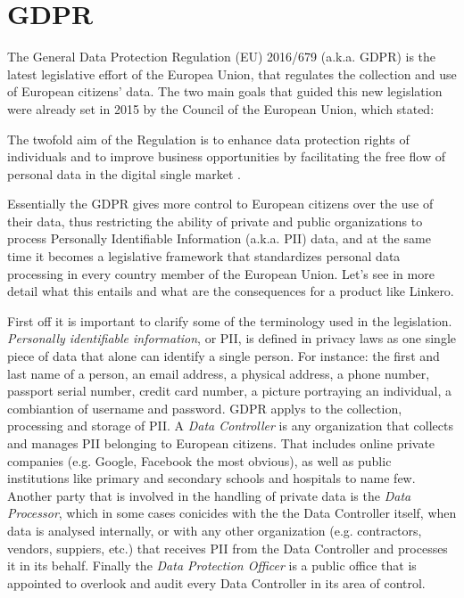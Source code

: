\section{GDPR}
The General Data Protection Regulation (EU) 2016/679 (a.k.a. GDPR) is the latest
legislative effort of the Europea Union, that regulates the collection
and use of European citizens' data. The two main goals that guided this new
legislation were already set in 2015 by the Council of the European Union, which
stated:
\begin{displayquote}
The twofold aim of the Regulation is to enhance data
protection rights of individuals and to improve business opportunities by facilitating the free
flow of personal data in the digital single market \cite{CoEU956515}.
\end{displayquote}
Essentially the GDPR gives more control to European citizens over the use of
their data, thus restricting the ability of private and public organizations to
process Personally Identifiable Information (a.k.a. PII) data, and at the same
time it becomes a legislative framework that standardizes personal data
processing in every country member of the European Union. Let's see in more
detail what this entails and what are the consequences for a product like
Linkero.

First off it is important to clarify some of the terminology used in the
legislation. \emph{Personally identifiable information}, or PII, is defined in
privacy laws as one single piece of data that alone can identify a single person. For
instance: the first and last name of a person, an email address, a physical
address, a phone number, passport serial number, credit card number, a picture portraying an
individual, a combiantion of username and password. GDPR applys to the
collection, processing and storage of PII. A \emph{Data Controller} is any
organization that collects and manages PII belonging to European citizens. That
includes online private companies (e.g. Google, Facebook the most obvious), as well as
public institutions like primary and secondary schools and hospitals to name
few. Another party that is involved in the handling of private data is the
\emph{Data Processor}, which in some cases conicides with the the Data
Controller itself, when data is analysed internally, or with any other organization (e.g.
contractors, vendors, suppiers, etc.) that receives PII from the Data Controller
and processes it in its behalf. Finally the \emph{Data Protection Officer} is a
public office that is appointed to overlook and audit every Data Controller in
its area of control.

